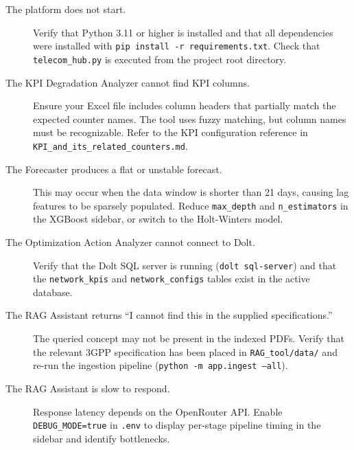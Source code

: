 \begin{description}
    \item[The platform does not start.] Verify that Python 3.11 or higher is installed and that all dependencies were installed with \texttt{pip install -r requirements.txt}. Check that \texttt{telecom\_hub.py} is executed from the project root directory.

    \item[The KPI Degradation Analyzer cannot find KPI columns.] Ensure your Excel file includes column headers that partially match the expected counter names. The tool uses fuzzy matching, but column names must be recognizable. Refer to the KPI configuration reference in \texttt{KPI\_and\_its\_related\_counters.md}.

    \item[The Forecaster produces a flat or unstable forecast.] This may occur when the data window is shorter than 21 days, causing lag features to be sparsely populated. Reduce \texttt{max\_depth} and \texttt{n\_estimators} in the XGBoost sidebar, or switch to the Holt-Winters model.

    \item[The Optimization Action Analyzer cannot connect to Dolt.] Verify that the Dolt SQL server is running (\texttt{dolt sql-server}) and that the \texttt{network\_kpis} and \texttt{network\_configs} tables exist in the active database.

    \item[The RAG Assistant returns ``I cannot find this in the supplied specifications.''] The queried concept may not be present in the indexed PDFs. Verify that the relevant 3GPP specification has been placed in \texttt{RAG\_tool/data/} and re-run the ingestion pipeline (\texttt{python -m app.ingest --all}).

    \item[The RAG Assistant is slow to respond.] Response latency depends on the OpenRouter API. Enable \texttt{DEBUG\_MODE=true} in \texttt{.env} to display per-stage pipeline timing in the sidebar and identify bottlenecks.
\end{description}
